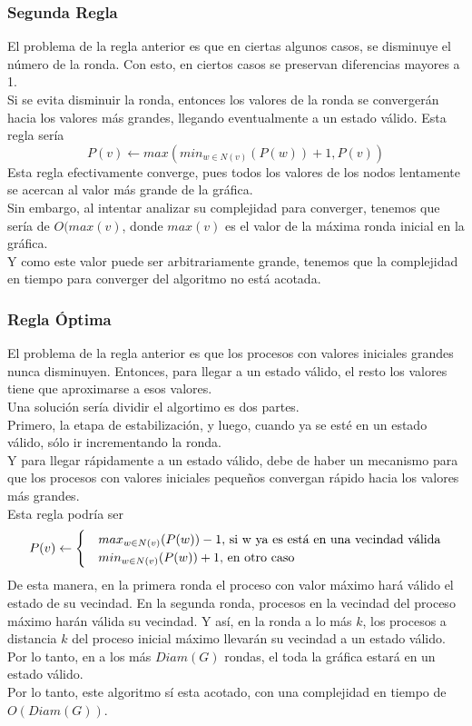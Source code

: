 \documentclass[12pt,a4paper]{article}
\begin{document}
{        \subsubsection{Segunda Regla}{
        El problema de la regla anterior es que en ciertas algunos casos, se
        disminuye el número de la ronda. Con esto, en ciertos casos se preservan
        diferencias mayores a 1.\\
        Si se evita disminuir la ronda, entonces los valores de la ronda se
        convergerán hacia los valores más grandes, llegando eventualmente a un
        estado válido.
        Esta regla sería
        \[P(v) \leftarrow max(min_{w \in N(v)}(P(w)) + 1, P(v))\]
        Esta regla efectivamente converge, pues todos los valores de los nodos
        lentamente se acercan al valor más grande de la gráfica.\\
        Sin embargo, al intentar analizar su complejidad para converger,
        tenemos que sería de $O(max(v)$, donde $max(v)$ es el valor
        de la máxima ronda inicial en la gráfica.\\
        Y como este valor puede ser arbitrariamente grande, tenemos que la
        complejidad en tiempo para converger del algoritmo no está acotada.
        }

        \subsubsection{Regla Óptima}{
        El problema de la regla anterior es que los procesos con valores iniciales
        grandes nunca disminuyen. Entonces, para llegar a un estado válido,
        el resto los valores tiene que aproximarse a esos valores.\\
        Una solución sería dividir el algortimo es dos partes.\\
        Primero, la etapa de estabilización, y luego, cuando ya se esté en un
        estado válido, sólo ir incrementando la ronda.\\
        Y para llegar rápidamente a un estado válido, debe de haber un mecanismo
        para que los procesos con valores iniciales pequeños convergan rápido
        hacia los valores más grandes.\\
        Esta regla podría ser
        \[P(v) \leftarrow
        \begin{cases}
            &max_{w \in N(v)}(P(w)) - 1, $ si w ya es está en una vecindad válida$ \\
            &min_{w \in N(v)}(P(w)) + 1, $ en otro caso $
        \end{cases}\]
        De esta manera, en la primera ronda el proceso con valor máximo hará
        válido el estado de su vecindad. En la segunda ronda, procesos en la
        vecindad del proceso máximo harán válida su vecindad. Y así, en la ronda
        a lo más $k$, los procesos a distancia $k$ del proceso inicial máximo
        llevarán su vecindad a un estado válido. \\
        Por lo tanto, en a los más $Diam(G)$ rondas, el toda la gráfica estará
        en un estado válido.\\
        Por lo tanto, este algoritmo sí esta acotado, con una complejidad en
        tiempo de $O(Diam(G))$.
        }
}
\end{document}
